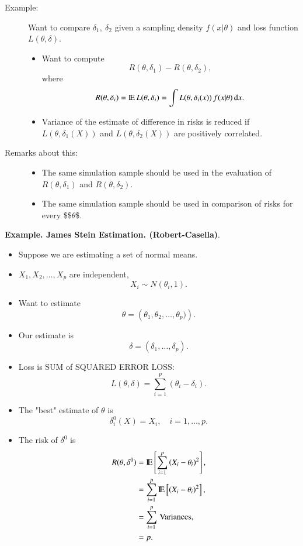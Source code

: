 \documentclass[11pt,english]{scrbook}
\begin{document}
\begin{description}
\item[{Example:}] Want to compare \(\delta_{1},\ \delta_{2}\) given a sampling density \(f(x|\theta)\) and loss function \(L(\theta,\delta)\).
\begin{itemize}
\item Want to compute
\[
    R(\theta,\delta_{1}) - R(\theta,\delta_{2}),
    \]
where
\[
    R(\theta,\delta_{i}) = \mathrm{I\hspace{-1.5pt}E}\,L(\theta,\delta_{i}) = \int L(\theta,\delta_{i}(x))\,f(x|\theta)\,\mathrm{d} x.
    \]
\item Variance of the estimate of difference in risks is reduced if \(L(\theta,\delta_{1}(X))\) and \(L(\theta,\delta_{2}(X))\) are positively correlated.
\end{itemize}

\item[{Remarks about this:}] \begin{itemize}
\item The same simulation sample should be used in the evaluation of \(R(\theta,\delta_{1})\) and \(R(\theta,\delta_{2})\).
\item The same simulation sample should be used in comparison of risks for every \$\$\(\theta\)\$.
\end{itemize}
\end{description}


\textbf{Example.  James Stein Estimation. (Robert-Casella)}.

\begin{itemize}
\item Suppose we are estimating a set of normal means.

\item \(X_{1},X_{2},\ldots,X_{p}\) are independent,
\[
  X_{i} \sim N(\theta_{i},1).
  \]

\item Want to estimate
\[
  \theta = \left(\theta_{1},\theta_{2},\ldots,\theta_{p}) \right).
  \]

\item Our estimate is
\[
  \delta = \left(\delta_{1},\ldots,\delta_{p}  \right).
  \]

\item Loss is SUM of SQUARED ERROR LOSS:
\[
  L(\theta,\delta) = \sum_{i=1}^{p}\left(\theta_{i} - \delta_{i} \right).
  \]

\item The "best" estimate of \(\theta\) is
\[
  \delta_{i}^{0}(X) = X_{i}, \quad i = 1,\ldots,p.
  \]

\item The risk of \(\delta^{0}\) is
\begin{align*}
R(\theta,\delta^{0}) & = \mathrm{I\hspace{-1.5pt}E} \left[ \sum_{i=1}^{p}\left(X_{i}-\theta_{i} \right)^{2} \right],  \\
& = \sum_{i=1}^{p} \mathrm{I\hspace{-1.5pt}E} \left[ \left(X_{i}-\theta_{i} \right)^{2} \right], \\
& = \sum_{i=1}^{p} \, \mathrm{Variances},  \\
& = p.
\end{align*}
\end{itemize}
\end{document}
